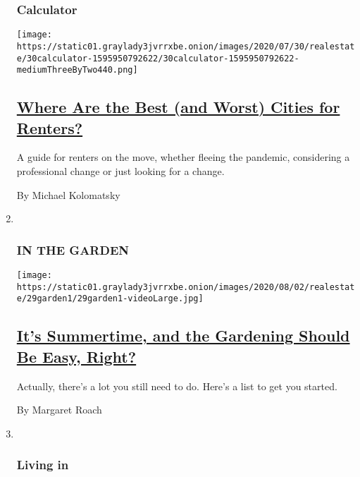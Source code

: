 \begin{enumerate}
{  \subsubsection{Calculator}\label{calculator}}

  \texttt{[image: https://static01.graylady3jvrrxbe.onion/images/2020/07/30/realestate/30calculator-1595950792622/30calculator-1595950792622-mediumThreeByTwo440.png]}

  \hypertarget{where-are-the-best-and-worst-cities-for-renters}{%
  \subsection{\texorpdfstring{\href{/2020/07/30/realestate/best-worst-cities-for-renters-coronavirus-relocation.html}{Where
  Are the Best (and Worst) Cities for
  Renters?}}{Where Are the Best (and Worst) Cities for Renters?}}\label{where-are-the-best-and-worst-cities-for-renters}}

  A guide for renters on the move, whether fleeing the pandemic,
  considering a professional change or just looking for a change.

  By Michael Kolomatsky
\item ~
  \hypertarget{in-the-garden}{%
  \subsubsection{IN THE GARDEN}\label{in-the-garden}}

  \texttt{[image: https://static01.graylady3jvrrxbe.onion/images/2020/08/02/realestate/29garden1/29garden1-videoLarge.jpg]}

  \hypertarget{its-summertime-and-the-gardening-should-be-easy-right}{%
  \subsection{\texorpdfstring{\href{/2020/07/29/realestate/garden-summer-august-chores.html}{It's
  Summertime, and the Gardening Should Be Easy,
  Right?}}{It's Summertime, and the Gardening Should Be Easy, Right?}}\label{its-summertime-and-the-gardening-should-be-easy-right}}

  Actually, there's a lot you still need to do. Here's a list to get you
  started.

  By Margaret Roach
\item ~
  \hypertarget{living-in}{%
  \subsubsection{Living in}\label{living-in}}


\end{enumerate}

